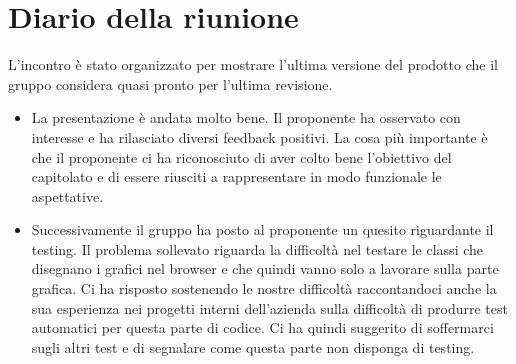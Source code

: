 \section{Diario della riunione}
L'incontro è stato organizzato per mostrare l'ultima versione del prodotto che il gruppo considera quasi
pronto per l'ultima revisione.

\begin{itemize}
    \item La presentazione è andata molto bene. Il proponente ha osservato con interesse e ha rilasciato diversi
    feedback positivi. La cosa più importante è che il proponente ci ha riconosciuto di aver colto bene
    l'obiettivo del capitolato e di essere riusciti a rappresentare in modo funzionale le aspettative.
    \item Successivamente il gruppo ha posto al proponente un quesito riguardante il testing. Il problema 
    sollevato riguarda la difficoltà nel testare le classi che disegnano i grafici nel browser e che quindi
    vanno solo a lavorare sulla parte grafica. Ci ha risposto sostenendo le nostre difficoltà raccontandoci
    anche la sua esperienza nei progetti interni dell'azienda sulla difficoltà di produrre test automatici
    per questa parte di codice. Ci ha quindi suggerito di soffermarci sugli altri test e di segnalare come
    questa parte non disponga di testing.
\end{itemize}


